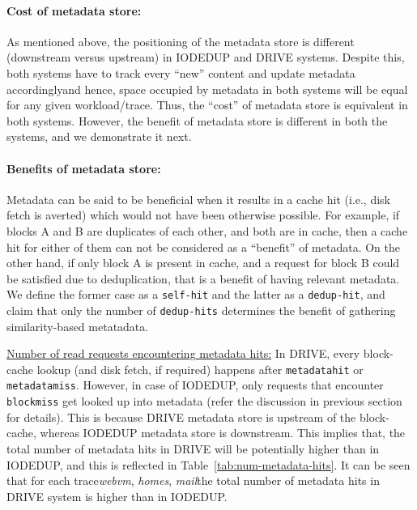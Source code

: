 \paragraph{Cost of metadata store:} 
As mentioned above, the positioning of the metadata store is
different (downstream versus upstream) in IODEDUP and DRIVE systems.
Despite this, both systems have to track every ``new'' content 
and update metadata accordingly\textemdash{}and hence, space occupied
by metadata in both systems will be equal for any given workload/trace.
Thus, the ``cost'' of metadata store is equivalent in both systems.
However, the benefit of metadata store is different in both the
systems, and we demonstrate it next.

\paragraph{Benefits of metadata store:}
Metadata can be said to be beneficial when it results in a cache 
hit (i.e., disk fetch is averted) which would not have been otherwise possible.
For example, if blocks A and B are duplicates of each other, and both
are in cache, then a cache hit for either of them can not be considered
as a ``benefit'' of metadata. On the other hand, if only block A is present in 
cache, and a request for block B could be satisfied due to deduplication,
that is a benefit of having relevant metadata. We define the former case
as a \texttt{self-hit} and the latter as a \texttt{dedup-hit}, and claim
that only the number of \texttt{dedup-hits} determines the benefit of 
gathering similarity-based metatadata. %

\underline{Number of read requests encountering metadata hits:}
In DRIVE, every block-cache lookup (and disk fetch, if required) happens
after \texttt{metadatahit} or \texttt{metadatamiss}. However, 
in case of IODEDUP, only requests that encounter \texttt{blockmiss}
get looked up into metadata (refer the discussion in previous section for details).
This is because DRIVE metadata store is upstream of the block-cache,
whereas IODEDUP metadata store is downstream. This implies that,
the total number of metadata hits in DRIVE will be potentially 
higher than in IODEDUP, and this is reflected in Table~\ref{tab:num-metadata-hits}.
It can be seen that for each trace\textemdash{}\textit{webvm}, \textit{homes}, 
\textit{mail}\textemdash{}the
total number of metadata hits in DRIVE system is higher than in IODEDUP.

